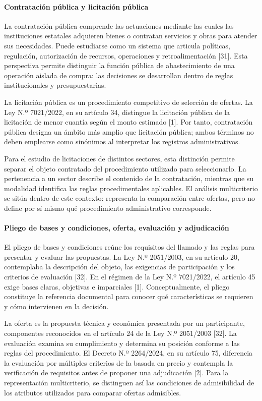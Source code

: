 \documentclass[12pt,a4paper]{article}
\begin{document}
\paragraph{Contratación pública y licitación pública}

La contratación pública comprende las actuaciones mediante las cuales las instituciones estatales adquieren bienes o contratan servicios y obras para atender sus necesidades. Puede estudiarse como un sistema que articula políticas, regulación, autorización de recursos, operaciones y retroalimentación [31]. Esta perspectiva permite distinguir la función pública de abastecimiento de una operación aislada de compra: las decisiones se desarrollan dentro de reglas institucionales y presupuestarias.

La licitación pública es un procedimiento competitivo de selección de ofertas. La Ley N.º 7021/2022, en su artículo 34, distingue la licitación pública de la licitación de menor cuantía según el monto estimado [1]. Por tanto, contratación pública designa un ámbito más amplio que licitación pública; ambos términos no deben emplearse como sinónimos al interpretar los registros administrativos.

Para el estudio de licitaciones de distintos sectores, esta distinción permite separar el objeto contratado del procedimiento utilizado para seleccionarlo. La pertenencia a un sector describe el contenido de la contratación, mientras que su modalidad identifica las reglas procedimentales aplicables. El análisis multicriterio se sitúa dentro de este contexto: representa la comparación entre ofertas, pero no define por sí mismo qué procedimiento administrativo corresponde.

\paragraph{Pliego de bases y condiciones, oferta, evaluación y adjudicación}

El pliego de bases y condiciones reúne los requisitos del llamado y las reglas para presentar y evaluar las propuestas. La Ley N.º 2051/2003, en su artículo 20, contemplaba la descripción del objeto, las exigencias de participación y los criterios de evaluación [32]. En el régimen de la Ley N.º 7021/2022, el artículo 45 exige bases claras, objetivas e imparciales [1]. Conceptualmente, el pliego constituye la referencia documental para conocer qué características se requieren y cómo intervienen en la decisión.

La oferta es la propuesta técnica y económica presentada por un participante, componentes reconocidos en el artículo 24 de la Ley N.º 2051/2003 [32]. La evaluación examina su cumplimiento y determina su posición conforme a las reglas del procedimiento. El Decreto N.º 2264/2024, en su artículo 75, diferencia la evaluación por múltiples criterios de la basada en precio y contempla la verificación de requisitos antes de proponer una adjudicación [2]. Para la representación multicriterio, se distinguen así las condiciones de admisibilidad de los atributos utilizados para comparar ofertas admisibles.
\end{document}
